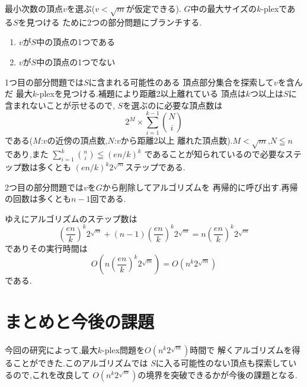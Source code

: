 \documentclass[a4j,twoside]{jarticle}
\begin{document}
\begin{論文概要}
最小次数の頂点$v$を選ぶ($v<\sqrt{m}$が仮定できる).
$G$中の最大サイズの$k$-plexである$S$を見つける
ために2つの部分問題にブランチする.
\begin{enumerate}
 \item $v$が$S$中の頂点の1つである
 \item $v$が$S$中の頂点の1つでない
\end{enumerate}

1つ目の部分問題では$S$に含まれる可能性のある
頂点部分集合を探索して$v$を含んだ
最大$k$-plexを見つける.補題により距離2以上離れている
頂点は$k$つ以上は$S$に含まれないことが示せるので,
$S$を選ぶのに必要な頂点数は
\[ 2^{M} \times  \sum_{i = 1}^{k - 1}\binom{N}{i}  \]
である($M$:$v$の近傍の頂点数,$N$:$v$から距離2以上
離れた頂点数).$M < \sqrt{m}$,$N \leqq n$ であり,また 
$ \sum_{i = 1}^{k}\binom{n}{i} \leqq ({en}/{k})^{k}$
であることが知られているので必要なステップ数は多くとも
$({en}/{k})^{k}2^{\sqrt{m}}$ステップである.

2つ目の部分問題では$v$を$G$から削除してアルゴリズムを
再帰的に呼び出す.再帰の回数は多くとも$n-1$回である.

ゆえにアルゴリズムのステップ数は
\[  {\left( \frac{en}{k} \right)}^{k}2^{\sqrt{m}} +  (n - 1){\left( \frac{en}{k} \right)}^{k}2^{\sqrt{m}} =n{\left( \frac{en}{k} \right)}^{k}2^{\sqrt{m}} \]
でありその実行時間は 
\[ O(n{\left( \frac{en}{k} \right)}^{k}2^{\sqrt{m}}) = O(n^{k}2^{\sqrt{m}}) \]
である.

\section{まとめと今後の課題}
今回の研究によって,最大$k$-plex問題を$O(n^{k}2^{\sqrt{m}})$時間で
解くアルゴリズムを得ることができた.このアルゴリズムでは
$S$に入る可能性のない頂点も探索しているので,これを改良して
$O(n^{k}2^{\sqrt{m}})$の境界を突破できるかが今後の課題となる.




\clearpage                       %
\end{論文概要}                   %
\end{document}

